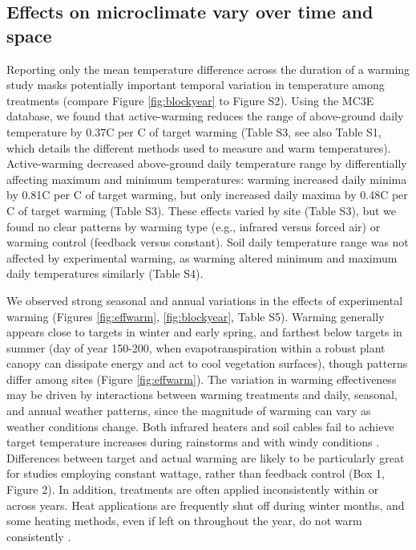 \documentclass{article}
\begin{document}
\subsection* {Effects on microclimate vary over time and space}
Reporting only the mean temperature difference across the duration of a warming study masks potentially important temporal variation in temperature among treatments (compare Figure \ref{fig:blockyear} to Figure S2). Using the MC3E database, we found that active-warming reduces the range of above-ground daily temperature by 0.37\degree C per \degree C of target warming (Table S3, see also Table S1, which details the different methods used to measure and warm temperatures). Active-warming decreased above-ground daily temperature range by differentially affecting maximum and minimum temperatures: warming increased daily minima by 0.81\degree C per \degree C of target warming, but only increased daily maxima by 0.48\degree C per \degree C of target warming (Table S3). These effects varied by site (Table S3), but we found no clear patterns by warming type (e.g., infrared versus forced air) or warming control (feedback versus constant). Soil daily temperature range was not affected by experimental warming, as warming altered minimum and maximum daily temperatures similarly (Table S4).

\par We observed strong seasonal and annual variations in the effects of experimental warming (Figures \ref{fig:effwarm}, \ref{fig:blockyear}, Table S5). Warming generally appears close to targets in winter and early spring, and farthest below targets in summer (day of year 150-200, when evapotranspiration within a robust plant canopy can dissipate energy and act to cool vegetation surfaces), though patterns differ among sites (Figure \ref{fig:effwarm}). 
The variation in warming effectiveness may be driven by interactions between warming treatments and daily, seasonal, and annual weather patterns, since the magnitude of warming can vary as weather conditions change. Both infrared heaters and soil cables fail to achieve target temperature increases during rainstorms \citep{peterjohn1993,hoeppner2012} and with windy conditions \citep{kimball2005,kimball2008}. Differences between target and actual warming are likely to be particularly great for studies employing constant wattage, rather than feedback control (Box 1, Figure 2). In addition, treatments are often applied inconsistently within or across years. Heat applications are frequently shut off during winter months, and some heating methods, even if left on throughout the year, do not warm consistently \citep[e.g.,][]{clark2014a,clark2014b,hagedorn2010}.
\end{document}
